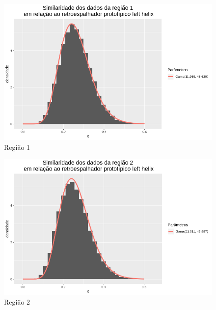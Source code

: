 \documentclass[12pt]{article}
\begin{document}
\begin{figure}[!h]
    \centering
    \includegraphics[width = \linewidth]{../../Images/Report_18_12_20/lh_region1.png}
    \caption{Região 1}
    \label{fig:lh_r1}
\end{figure}

\begin{figure}[!h]
    \centering
    \vspace{0.1\linewidth}
    \includegraphics[width = \linewidth]{../../Images/Report_18_12_20/lh_region2.png}
    \caption{Região 2}
    \label{fig:lh_r2}
\end{figure}
\end{document}
